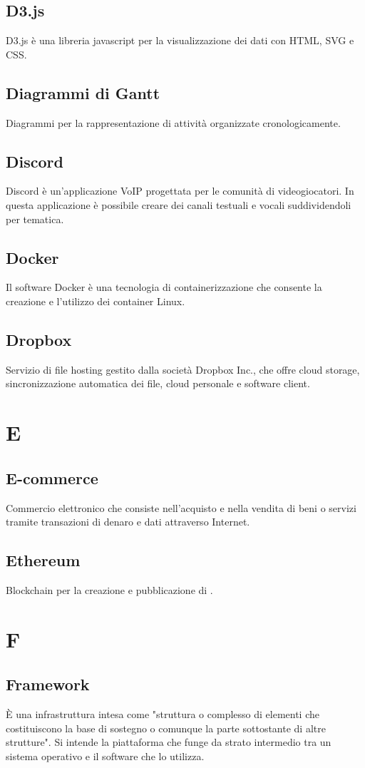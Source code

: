 \subsection{D3.js} D3.js è una libreria javascript per la visualizzazione dei dati con HTML, SVG e CSS.
\subsection{Diagrammi di Gantt} Diagrammi per la rappresentazione di attività organizzate cronologicamente.
\subsection{Discord} Discord è un’applicazione VoIP progettata per le comunità di videogiocatori. In questa applicazione è possibile creare dei canali testuali e vocali suddividendoli per tematica.
\subsection{Docker} Il software Docker è una tecnologia di containerizzazione che consente la creazione e l’utilizzo dei container Linux.
\subsection{Dropbox} Servizio di file hosting gestito dalla società Dropbox Inc., che offre cloud storage, sincronizzazione automatica dei file, cloud personale e software client.
\newpage \section{E}
\subsection{E-commerce} Commercio elettronico che consiste nell'acquisto e nella vendita di beni o servizi tramite transazioni di denaro e dati attraverso Internet.
\subsection{Ethereum} Blockchain per la creazione e pubblicazione di .
\newpage \section{F}
\subsection{Framework} È una infrastruttura intesa come "struttura o complesso di elementi che costituiscono la base di sostegno o comunque la parte sottostante di altre strutture". Si intende la piattaforma che funge da strato intermedio tra un sistema operativo e il software che lo utilizza.
